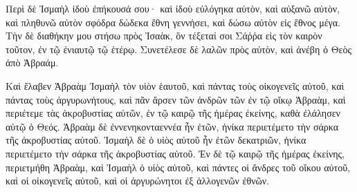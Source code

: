 {Περὶ δὲ Ἰσμαὴλ ἰδοὺ ἐπήκουσά σου· καὶ ἰδοὺ εὐλόγηκα αὐτὸν, καὶ αὐξανῶ αὐτὸν, καὶ πληθυνῶ αὐτὸν σφόδρα δώδεκα ἔθνη γεννήσει, καὶ δώσω αὐτὸν εἰς ἔθνος μέγα.
Τὴν δὲ διαθήκην μου στήσω πρὸς Ἰσαὰκ, ὃν τέξεταί σοι Σάῤῥα εἰς τὸν καιρὸν τοῦτον, ἐν τῷ ἐνιαυτῷ τῷ ἑτέρῳ.
Συνετέλεσε δὲ λαλῶν πρὸς αὐτὸν, καὶ ἀνέβη ὁ Θεὸς ἀπὸ Ἁβραάμ.
\par }{\PP {}Καὶ ἔλαβεν Ἁβραὰμ Ἰσμαὴλ τὸν υἱὸν ἑαυτοῦ, καὶ πάντας τοὺς οἰκογενεῖς αὐτοῦ, καὶ πάντας τοὺς ἀργυρωνήτους, καὶ πᾶν ἄρσεν τῶν ἀνδρῶν τῶν ἐν τῷ οἴκῳ Ἁβραὰμ, καὶ περιέτεμε τὰς ἀκροβυστίας αὐτῶν, ἐν τῷ καιρῷ τῆς ἡμέρας ἐκείνης, καθὰ ἐλάλησεν αὐτῷ ὁ Θεός.
Ἁβραὰμ δὲ ἐννενηκονταεννέα ἦν ἐτῶν, ἡνίκα περιετέμετο τὴν σάρκα τῆς ἀκροβυστίας αὐτοῦ.
Ἰσμαὴλ δὲ ὁ υἱὸς αὐτοῦ ἦν ἐτῶν δεκατριῶν, ἡνίκα περιετέμετο τὴν σάρκα τῆς ἀκροβυστίας αὐτοῦ.
Ἐν δὲ τῷ καιρῷ τῆς ἡμέρας ἐκείνης, περιετμήθη Ἁβραὰμ, καὶ Ἰσμαὴλ ὁ υἱὸς αὐτοῦ,
καὶ πάντες οἱ ἄνδρες τοῦ οἴκου αὐτοῦ, καὶ οἱ οἰκογενεῖς αὐτοῦ, καὶ οἱ ἀργυρώνητοι ἐξ ἀλλογενῶν ἐθνῶν.

}
